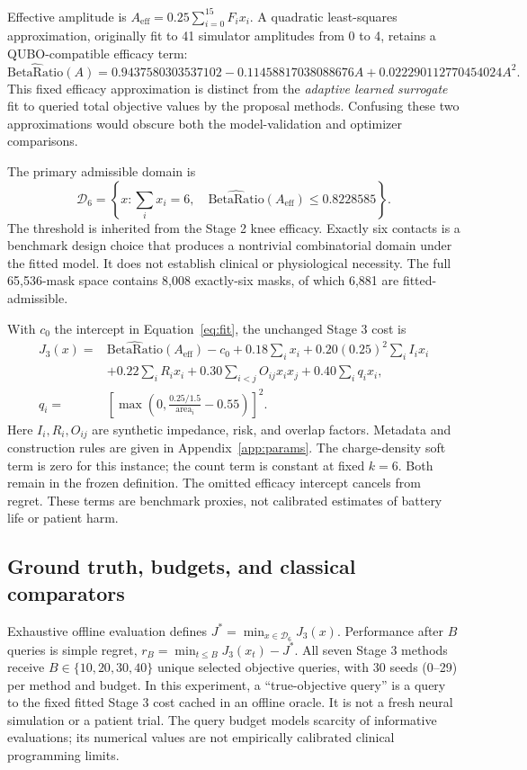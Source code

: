 \documentclass[11pt,letterpaper]{article}
\newcommand{\br}{\mathrm{BetaRatio}}
\newcommand{\Aeff}{A_{\mathrm{eff}}}
\begin{document}
Effective amplitude is $\Aeff=0.25\sum_{i=0}^{15}F_i x_i$. A quadratic least-squares approximation, originally fit to 41 simulator amplitudes from 0 to 4, retains a QUBO-compatible efficacy term:
\begin{equation}
\widehat{\br}(A)=0.9437580303537102-0.11458817038088676A+0.022290112770454024A^2.
\label{eq:fit}
\end{equation}
This fixed efficacy approximation is distinct from the \emph{adaptive learned surrogate} fit to queried total objective values by the proposal methods. Confusing these two approximations would obscure both the model-validation and optimizer comparisons.

The primary admissible domain is
\begin{equation}
\mathcal D_6=\left\{x:\sum_i x_i=6,\quad\widehat{\br}(\Aeff)\leq0.8228585\right\}.
\end{equation}
The threshold is inherited from the Stage 2 knee efficacy. Exactly six contacts is a benchmark design choice that produces a nontrivial combinatorial domain under the fitted model. It does not establish clinical or physiological necessity. The full 65,536-mask space contains 8,008 exactly-six masks, of which 6,881 are fitted-admissible.

With $c_0$ the intercept in Equation~\ref{eq:fit}, the unchanged Stage 3 cost is
\begin{align}
J_3(x)={}&\widehat{\br}(\Aeff)-c_0+0.18\sum_i x_i
+0.20(0.25)^2\sum_i I_i x_i\nonumber\\
&+0.22\sum_i R_i x_i+0.30\sum_{i<j}O_{ij}x_ix_j
+0.40\sum_i q_i x_i,\\
q_i={}&\left[\max\!\left(0,\frac{0.25/1.5}{\mathrm{area}_i}-0.55\right)\right]^2.
\end{align}
Here $I_i,R_i,O_{ij}$ are synthetic impedance, risk, and overlap factors. Metadata and construction rules are given in Appendix~\ref{app:params}. The charge-density soft term is zero for this instance; the count term is constant at fixed $k=6$. Both remain in the frozen definition. The omitted efficacy intercept cancels from regret. These terms are benchmark proxies, not calibrated estimates of battery life or patient harm.

\subsection{Ground truth, budgets, and classical comparators}
Exhaustive offline evaluation defines $J^*=\min_{x\in\mathcal D_6}J_3(x)$. Performance after $B$ queries is simple regret, $r_B=\min_{t\leq B}J_3(x_t)-J^*$. All seven Stage 3 methods receive $B\in\{10,20,30,40\}$ unique selected objective queries, with 30 seeds (0--29) per method and budget. In this experiment, a ``true-objective query'' is a query to the fixed fitted Stage 3 cost cached in an offline oracle. It is not a fresh neural simulation or a patient trial. The query budget models scarcity of informative evaluations; its numerical values are not empirically calibrated clinical programming limits.
\end{document}
